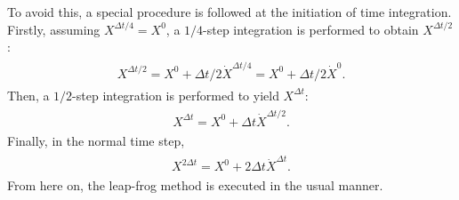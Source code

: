 To avoid this, a special procedure is followed at the initiation of time integration. Firstly, assuming \(X^{\Delta t/4} = X^0\), a \(1/4\)-step integration is performed to obtain \(X^{\Delta t/2}\):
\begin{eqnarray}\begin{aligned}
  X^{\Delta t/2} = X^0 + \Delta t/2 \dot{X}^{\Delta t/4}
                 = X^0 + \Delta t/2 \dot{X}^0.\end{aligned}\end{eqnarray} Then, a \(1/2\)-step integration is performed to yield \(X^{\Delta t}\): \begin{eqnarray}\begin{aligned}
  X^{\Delta t}   = X^0 + \Delta t \dot{X}^{\Delta t/2}.\end{aligned}\end{eqnarray} Finally, in the normal time step, \begin{eqnarray}\begin{aligned}
  X^{2\Delta t}   = X^0 + 2 \Delta t \dot{X}^{\Delta t}.\end{aligned}\end{eqnarray} From here on, the leap-frog method is executed in the usual manner.
